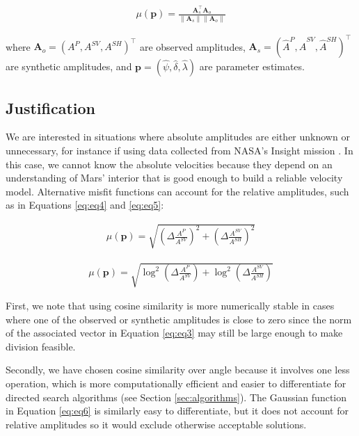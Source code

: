 \documentclass[preprint]{seismica}
\begin{document}
     \begin{align} \label{eq:eq3}
         \mu(\mathbf{p}) = \frac{\mathbf{A}_s^\top\mathbf{A}_o}{\|\mathbf{A}_s\|\|\mathbf{A}_o\|}
     \end{align}

     where $\mathbf{A}_o = (A^P, A^{SV}, A^{SH})^\top$ are observed amplitudes, $\mathbf{A}_s = (\widehat{A}^P, \widehat{A}^{SV}, \widehat{A}^{SH})^\top$ are synthetic amplitudes, and $\mathbf{p} = (\widehat{\psi}, \widehat{\delta}, \widehat{\lambda})$ are parameter estimates.

     \subsection{Justification}
     We are interested in situations where absolute amplitudes are either unknown or unnecessary, for instance if using data collected from NASA's Insight mission \citep{sita_potential_2022}.
     In this case, we cannot know the absolute velocities because they depend on an understanding of Mars' interior that is good enough to build a reliable velocity model. Alternative misfit functions can account for the relative amplitudes, such as in Equations \ref{eq:eq4} and \ref{eq:eq5}:

     \begin{align} \label{eq:eq4}
         \mu(\mathbf{p}) = \sqrt{\left( \Delta \frac{A^{P}}{A^{SV}}\right)^2 + \left( \Delta \frac{A^{SV}}{A^{SH}}\right)^2}
     \end{align}

     \begin{align} \label{eq:eq5}
         \mu(\mathbf{p}) = \sqrt{\log^2 \left( \Delta \frac{A^P}{A^{SV}} \right) + \log^2 \left( \Delta \frac{A^{SV}}{A^{SH}} \right)}
     \end{align}

     First, we note that using cosine similarity is more numerically stable in cases where one of the observed or synthetic amplitudes is close to zero since the norm of the associated vector in Equation \ref{eq:eq3} may still be large enough to make division feasible.

     Secondly, we have chosen cosine similarity over angle because it involves one less operation, which is more computationally efficient and easier to differentiate for directed search algorithms (see Section \ref{sec:algorithms}). The Gaussian function in Equation \ref{eq:eq6} is similarly easy to differentiate, but it does not account for relative amplitudes so it would exclude otherwise acceptable solutions.
\end{document}
